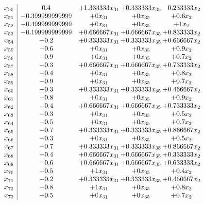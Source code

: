 \documentclass[11pt]{article}
\begin{document}
\[\begin{array}{c| c c@{\hskip 2pt} c@{\hskip 2pt} c@{\hskip 2pt} }
 x_{50}   &  0.4 & + 1.333333 x_{31} & + 0.333333 x_{35} & -0.233333 x_{2}\\
 x_{51}   &  -0.399999999999 & + 0 x_{31} & + 0 x_{35} & + 0.6 x_{2}\\
 x_{52}   &  -0.499999999999 & + 0 x_{31} & + 0 x_{35} & + 1 x_{2}\\
 x_{53}   &  -0.199999999999 & + 0.666667 x_{31} & + 0.666667 x_{35} & + 0.833333 x_{2}\\
 x_{54}   &  -0.2 & + 0.333333 x_{31} & + 0.333333 x_{35} & + 0.666667 x_{2}\\
 x_{55}   &  -0.6 & + 0 x_{31} & + 0 x_{35} & + 0.9 x_{2}\\
 x_{56}   &  -0.9 & + 0 x_{31} & + 0 x_{35} & + 0.7 x_{2}\\
 x_{57}   &  -0.3 & + 0.666667 x_{31} & + 0.666667 x_{35} & + 0.733333 x_{2}\\
 x_{58}   &  -0.4 & + 0 x_{31} & + 0 x_{35} & + 0.8 x_{2}\\
 x_{59}   &  -0.9 & + 0 x_{31} & + 0 x_{35} & + 0.7 x_{2}\\
 x_{60}   &  -0.3 & + 0.333333 x_{31} & + 0.333333 x_{35} & + 0.466667 x_{2}\\
 x_{61}   &  -0.8 & + 0 x_{31} & + 0 x_{35} & + 0.9 x_{2}\\
 x_{62}   &  -0.4 & + 0.666667 x_{31} & + 0.666667 x_{35} & + 0.733333 x_{2}\\
 x_{63}   &  -0.3 & + 0 x_{31} & + 0 x_{35} & + 0.5 x_{2}\\
 x_{64}   &  -0.5 & + 0 x_{31} & + 0 x_{35} & + 0.7 x_{2}\\
 x_{65}   &  -0.7 & + 0.333333 x_{31} & + 0.333333 x_{35} & + 0.866667 x_{2}\\
 x_{66}   &  -0.3 & + 0 x_{31} & + 0 x_{35} & + 0.5 x_{2}\\
 x_{67}   &  -0.7 & + 0.333333 x_{31} & + 0.333333 x_{35} & + 0.866667 x_{2}\\
 x_{68}   &  -0.4 & + 0.666667 x_{31} & + 0.666667 x_{35} & + 0.333333 x_{2}\\
 x_{69}   &  -0.6 & + 0.666667 x_{31} & + 0.666667 x_{35} & + 0.633333 x_{2}\\
 x_{70}   &  -0.5 & + 1 x_{31} & + 0 x_{35} & + 0.4 x_{2}\\
 x_{71}   &  -0.2 & + 0.333333 x_{31} & + 0.333333 x_{35} & + 0.466667 x_{2}\\
 x_{72}   &  -0.8 & + 1 x_{31} & + 0 x_{35} & + 0.8 x_{2}\\
 x_{73}   &  -0.5 & + 0 x_{31} & + 0 x_{35} & + 0.7 x_{2}\\

\end{array}\]
\end{document}
